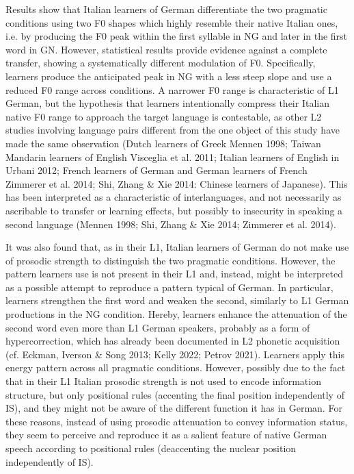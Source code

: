 \begin{styleStandard}
Results show that Italian learners of German differentiate the two pragmatic conditions using two F0 shapes which highly resemble their native Italian ones, i.e. by producing the F0 peak within the first syllable in NG and later in the first word in GN. However, statistical results provide evidence against a complete transfer, showing a systematically different modulation of F0. Specifically, learners produce the anticipated peak in NG with a less steep slope and use a reduced F0 range across conditions. A narrower F0 range is characteristic of L1 German, but the hypothesis that learners intentionally compress their Italian native F0 range to approach the target language is contestable, as other L2 studies involving language pairs different from the one object of this study have made the same observation (Dutch learners of Greek Mennen 1998; Taiwan Mandarin learners of English Visceglia et al. 2011; Italian learners of English in Urbani 2012; French learners of German and German learners of French Zimmerer et al. 2014; Shi, Zhang \& Xie 2014: Chinese learners of Japanese). This has been interpreted as a characteristic of interlanguages, and not necessarily as ascribable to transfer or learning effects, but possibly to insecurity in speaking a second language (Mennen 1998; Shi, Zhang \& Xie 2014; Zimmerer et al. 2014).
\end{styleStandard}

\begin{styleStandard}
It was also found that, as in their L1, Italian learners of German do not make use of prosodic strength to distinguish the two pragmatic conditions. However, the pattern learners use is not present in their L1 and, instead, might be interpreted as a possible attempt to reproduce a pattern typical of German. In particular, learners strengthen the first word and weaken the second, similarly to L1 German productions in the NG condition. Hereby, learners enhance the attenuation of the second word even more than L1 German speakers, probably as a form of hypercorrection, which has already been documented in L2 phonetic acquisition (cf. Eckman, Iverson \& Song 2013; Kelly 2022; Petrov 2021). Learners apply this energy pattern across all pragmatic conditions. However, possibly due to the fact that in their L1 Italian prosodic strength is not used to encode information structure, but only positional rules (accenting the final position independently of IS), and they might not be aware of the different function it has in German. For these reasons, instead of using prosodic attenuation to convey information status, they seem to perceive and reproduce it as a salient feature of native German speech according to positional rules (deaccenting the nuclear position independently of IS).
\end{styleStandard}

